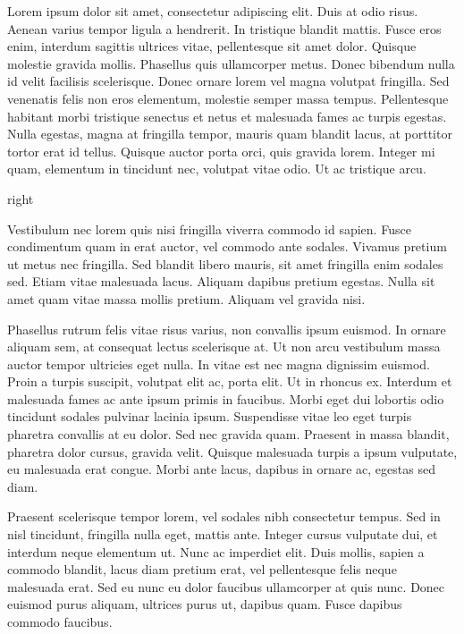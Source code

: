 \documentclass{article}
\begin{document}
Lorem ipsum dolor sit amet, consectetur adipiscing elit. Duis at odio risus. Aenean varius tempor ligula a hendrerit. In tristique blandit mattis. Fusce eros enim, interdum sagittis ultrices vitae, pellentesque sit amet dolor. Quisque molestie gravida mollis. Phasellus quis ullamcorper metus. Donec bibendum nulla id velit facilisis scelerisque. Donec ornare lorem vel magna volutpat fringilla. Sed venenatis felis non eros elementum, molestie semper massa tempus. Pellentesque habitant morbi tristique senectus et netus et malesuada fames ac turpis egestas. Nulla egestas, magna at fringilla tempor, mauris quam blandit lacus, at porttitor tortor erat id tellus. Quisque auctor porta orci, quis gravida lorem. Integer mi quam, elementum in tincidunt nec, volutpat vitae odio. Ut ac tristique arcu.

\begin{floating}{right}
\end{floating}

Vestibulum nec lorem quis nisi fringilla viverra commodo id sapien. Fusce condimentum quam in erat auctor, vel commodo ante sodales. Vivamus pretium ut metus nec fringilla. Sed blandit libero mauris, sit amet fringilla enim sodales sed. Etiam vitae malesuada lacus. Aliquam dapibus pretium egestas. Nulla sit amet quam vitae massa mollis pretium. Aliquam vel gravida nisi.

Phasellus rutrum felis vitae risus varius, non convallis ipsum euismod. In ornare aliquam sem, at consequat lectus scelerisque at. Ut non arcu vestibulum massa auctor tempor ultricies eget nulla. In vitae est nec magna dignissim euismod. Proin a turpis suscipit, volutpat elit ac, porta elit. Ut in rhoncus ex. Interdum et malesuada fames ac ante ipsum primis in faucibus. Morbi eget dui lobortis odio tincidunt sodales pulvinar lacinia ipsum. Suspendisse vitae leo eget turpis pharetra convallis at eu dolor. Sed nec gravida quam. Praesent in massa blandit, pharetra dolor cursus, gravida velit. Quisque malesuada turpis a ipsum vulputate, eu malesuada erat congue. Morbi ante lacus, dapibus in ornare ac, egestas sed diam.

Praesent scelerisque tempor lorem, vel sodales nibh consectetur tempus. Sed in nisl tincidunt, fringilla nulla eget, mattis ante. Integer cursus vulputate dui, et interdum neque elementum ut. Nunc ac imperdiet elit. Duis mollis, sapien a commodo blandit, lacus diam pretium erat, vel pellentesque felis neque malesuada erat. Sed eu nunc eu dolor faucibus ullamcorper at quis nunc. Donec euismod purus aliquam, ultrices purus ut, dapibus quam. Fusce dapibus commodo faucibus.
\end{document}
